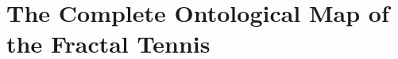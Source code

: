 \documentclass[11pt,a4paper]{article}
\begin{document}

\section{The Complete Ontological Map of the Fractal Tennis}
\end{document}
